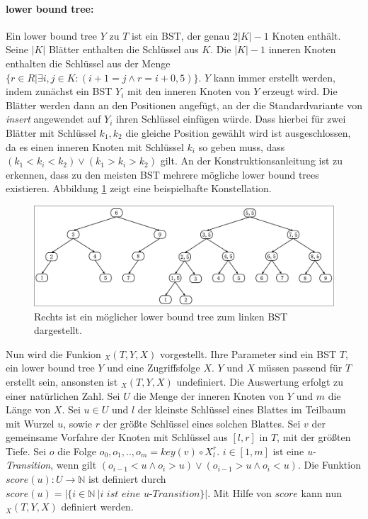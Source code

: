 \documentclass[a4paper,12pt]{article}
\begin{document}
\paragraph{lower bound tree:} \label{wilberLowerBoundTree}
Ein lower bound tree $Y$ zu $T$ ist ein BST, der genau $2 \vert K\vert  - 1$ Knoten enthält. Seine $\vert K \vert$ Blätter enthalten die Schlüssel aus $K$. Die $\vert K \vert - 1$ inneren Knoten enthalten die Schlüssel aus der Menge $\{r \in R \vert \exists i,j \in K \colon \left( i + 1 = j \land r = i + 0,5\right)\}$. $Y$ kann immer erstellt werden, indem zunächst ein BST $Y_i$ mit den inneren Knoten von $Y$ erzeugt wird. Die Blätter werden dann an den Positionen angefügt, an der die Standardvariante von \textit{insert} angewendet auf $Y_i$ ihren Schlüssel einfügen würde. Dass hierbei für zwei Blätter mit Schlüssel $k_1, k_2$ die gleiche Position gewählt wird ist ausgeschlossen, da es einen inneren Knoten mit Schlüssel $k_i$ so geben muss, dass $\left(k_1 < k_i < k_2\right) \lor \left(k_1 > k_i > k_2 \right)$ gilt. An der Konstruktionsanleitung ist zu erkennen, dass zu den meisten BST mehrere mögliche lower bound trees existieren. Abbildung \ref{fig:lowerBoundTree} zeigt eine beispielhafte Konstellation. \\



\begin{figure}[H]
	\centering
	\includegraphics[width=1\textwidth]{"Medien/DynOpt/lowerBoundTree"}
	\caption{Rechts ist ein möglicher lower bound tree zum linken BST dargestellt.  }
	\label{fig:lowerBoundTree}
\end{figure}

\noindent Nun wird die Funkion $_X(T, Y, X) $ vorgestellt. Ihre Parameter sind ein BST $T$, ein lower bound tree $Y$ und eine Zugriffsfolge $X$. $Y$ und $X$ müssen passend für $T$ erstellt sein, ansonsten ist $_X(T, Y, X) $ undefiniert. Die Auswertung erfolgt zu einer natürlichen Zahl. Sei $U$ die Menge der inneren Knoten von $Y$ und $m$ die Länge von $X$. Sei $u \in U$ und $l$ der kleinste Schlüssel eines Blattes im Teilbaum mit Wurzel $u$, sowie $r$ der größte Schlüssel eines solchen Blattes. Sei $v$ der gemeinsame Vorfahre der Knoten mit Schlüssel aus $\left[l, r\right]$  in $T$, mit der größten Tiefe. Sei $o$ die Folge $o_0, o_1,..,o_m =  \mathit{key}(v) \circ X^r_l$. $i \in \left[1,m\right]$ ist eine  \mbox{\textit{u-Transition}}, wenn gilt $\left( o_{i-1} < u \land o_i > u \right) \lor \left( o_{i-1} > u \land o_i < u \right)$. Die Funktion $\mathit{score}\left(u\right) \colon U \rightarrow \mathbb{N}$ ist definiert durch $\mathit{score}\left(u\right) = \vert\{i \in \mathbb{N}\ \vert \textit{i ist eine u-Transition}\} \vert$. Mit Hilfe von $\mathit{score}$ kann nun  $_X(T, Y, X) $ definiert werden.
\end{document}

